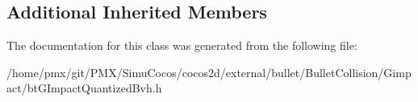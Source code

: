 \subsection*{Additional Inherited Members}


The documentation for this class was generated from the following file\+:\begin{DoxyCompactItemize}
\item 
/home/pmx/git/\+P\+M\+X/\+Simu\+Cocos/cocos2d/external/bullet/\+Bullet\+Collision/\+Gimpact/bt\+G\+Impact\+Quantized\+Bvh.\+h\end{DoxyCompactItemize}
